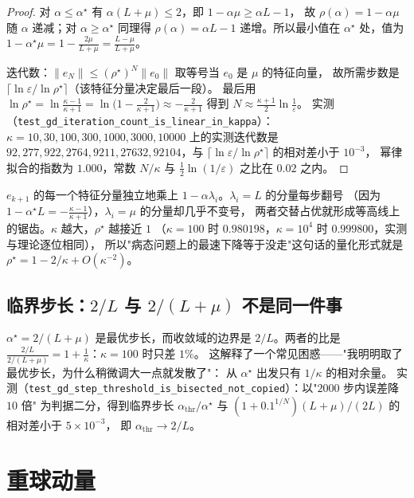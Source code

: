 \begin{proof}
对 $\alpha\le\alpha^\star$ 有 $\alpha(L+\mu)\le2$，即 $1-\alpha\mu\ge\alpha L-1$，
故 $\rho(\alpha)=1-\alpha\mu$ 随 $\alpha$ 递减；对 $\alpha\ge\alpha^\star$ 同理得
$\rho(\alpha)=\alpha L-1$ 递增。所以最小值在 $\alpha^\star$ 处，值为
$1-\alpha^\star\mu=1-\frac{2\mu}{L+\mu}=\frac{L-\mu}{L+\mu}$。

迭代数：$\|e_N\|\le(\rho^\star)^N\|e_0\|$ 取等号当 $e_0$ 是 $\mu$ 的特征向量，
故所需步数是 $\lceil\ln\varepsilon/\ln\rho^\star\rceil$（该特征分量决定最后一段）。
最后用 $\ln\rho^\star=\ln\frac{\kappa-1}{\kappa+1}
=\ln\bigl(1-\frac{2}{\kappa+1}\bigr)\approx-\frac{2}{\kappa+1}$
得到 $N\approx\frac{\kappa+1}{2}\ln\frac1\varepsilon$。
实测（\texttt{test\_gd\_iteration\_count\_is\_linear\_in\_kappa}）：$\kappa=10,30,100,300,1000,3000,10000$
上的实测迭代数是 $92,277,922,2764,9211,27632,92104$，与
$\lceil\ln\varepsilon/\ln\rho^\star\rceil$ 的相对差小于 $10^{-3}$，
幂律拟合的指数为 $1.000$，常数 $N/\kappa$ 与 $\tfrac12\ln(1/\varepsilon)$ 之比在 $0.02$ 之内。
\end{proof}

\begin{remark}[锯齿的几何]
$e_{k+1}$ 的每一个特征分量独立地乘上 $1-\alpha\lambda_i$。$\lambda_i=L$ 的分量每步翻号
（因为 $1-\alpha^\star L=-\frac{\kappa-1}{\kappa+1}$），$\lambda_i=\mu$ 的分量却几乎不变号，
两者交替占优就形成等高线上的锯齿。$\kappa$ 越大，$\rho^\star$ 越接近 $1$
（$\kappa=100$ 时 $0.980198$，$\kappa=10^4$ 时 $0.999800$，实测与理论逐位相同），
所以"病态问题上的最速下降等于没走"这句话的量化形式就是 $\rho^\star=1-2/\kappa+O(\kappa^{-2})$。
\end{remark}

\subsection{临界步长：$2/L$ 与 $2/(L+\mu)$ 不是同一件事}

$\alpha^\star=2/(L+\mu)$ 是最优步长，而收敛域的边界是 $2/L$。两者的比是
$\frac{2/L}{2/(L+\mu)}=1+\frac1\kappa$：$\kappa=100$ 时只差 $1\%$。
这解释了一个常见困惑——"我明明取了最优步长，为什么稍微调大一点就发散了"：
从 $\alpha^\star$ 出发只有 $1/\kappa$ 的相对余量。
实测（\texttt{test\_gd\_step\_threshold\_is\_bisected\_not\_copied}）：以"$2000$ 步内误差降 $10$ 倍"
为判据二分，得到临界步长 $\alpha_{\text{thr}}/\alpha^\star$ 与
$(1+0.1^{1/N})(L+\mu)/(2L)$ 的相对差小于 $5\times10^{-3}$，
即 $\alpha_{\text{thr}}\to2/L$。

\section{重球动量}

